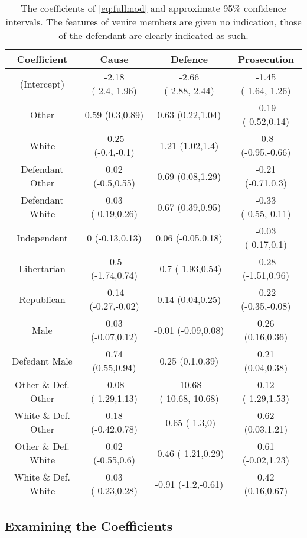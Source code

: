\begin{table}[h!]
  \centering
  \caption[Final Model Race Coefficients Confidence Intervals Excluding Kept]{\footnotesize The coefficients of \ref{eq:fullmod}
    and approximate 95\% confidence intervals. The features of venire members are given no indication, those of the defendant are
    clearly indicated as such.}
  \label{tab:fullmodracecoef}
  \begin{tabular}{|c|c|c|c|} \hline
    Coefficient & Cause & Defence & Prosecution \\ \hline
    (Intercept) & -2.18 (-2.4,-1.96) & -2.66 (-2.88,-2.44) & -1.45 (-1.64,-1.26)\\
    Other & 0.59 (0.3,0.89) & 0.63 (0.22,1.04) & -0.19 (-0.52,0.14)\\
    White & -0.25 (-0.4,-0.1) & 1.21 (1.02,1.4) & -0.8 (-0.95,-0.66)\\
    Defendant Other & 0.02 (-0.5,0.55) & 0.69 (0.08,1.29) & -0.21 (-0.71,0.3)\\
    Defendant White & 0.03 (-0.19,0.26) & 0.67 (0.39,0.95) & -0.33 (-0.55,-0.11)\\
    Independent & 0 (-0.13,0.13) & 0.06 (-0.05,0.18) & -0.03 (-0.17,0.1)\\
    Libertarian & -0.5 (-1.74,0.74) & -0.7 (-1.93,0.54) & -0.28 (-1.51,0.96)\\
    Republican & -0.14 (-0.27,-0.02) & 0.14 (0.04,0.25) & -0.22 (-0.35,-0.08)\\
    Male & 0.03 (-0.07,0.12) & -0.01 (-0.09,0.08) & 0.26 (0.16,0.36)\\
    Defedant Male & 0.74 (0.55,0.94) & 0.25 (0.1,0.39) & 0.21 (0.04,0.38)\\
    Other \& Def. Other & -0.08 (-1.29,1.13) & -10.68 (-10.68,-10.68) & 0.12 (-1.29,1.53)\\
    White \& Def. Other & 0.18 (-0.42,0.78) & -0.65 (-1.3,0) & 0.62 (0.03,1.21)\\
    Other \& Def. White & 0.02 (-0.55,0.6) & -0.46 (-1.21,0.29) & 0.61 (-0.02,1.23)\\
    White \& Def. White & 0.03 (-0.23,0.28) & -0.91 (-1.2,-0.61) & 0.42 (0.16,0.67) \\ \hline
  \end{tabular}
\end{table}

\subsection{Examining the Coefficients} \label{sec:examcoef}

